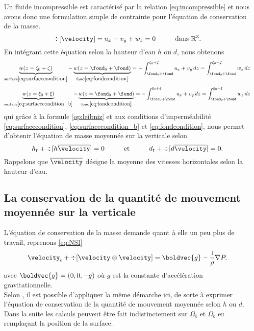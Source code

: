 \noindent Un fluide incompressible est caractérisé par la relation \eqref{eq:incompressible} et nous avons donc une formulation simple de contrainte pour l'équation de conservation de la masse.
\begin{equation}
	\div[\velocity] = u_x + v_y + w_z = 0 \hspace{1cm}\text{dans $\mathbb{R}^3$.}
\end{equation}
En intégrant cette équation selon la hauteur d'eau $h$ ou $d$, nous obtenons
\begin{equation}
	\underbrace{w(z=\zeta_0+\zeta)}_{\text{surface}\eqref{eq:surfacecondition} } - \underbrace{w(z=\fond_0 + \fond)}_{\text{fond} \eqref{eq:fondcondition}}  =  - \int_{\fond_0 + \fond}^{\zeta_0+\zeta}u_x + v_y\,dz = \int_{\fond_0 + \fond}^{\zeta_0+\zeta} w_z\,dz
\end{equation}
\begin{equation}
\underbrace{w(z=\xi_0+\xi)}_{\text{surface}\eqref{eq:surfacecondition_b} } - \underbrace{w(z=\fond_0 + \fond)}_{\text{fond} \eqref{eq:fondcondition}}  =  - \int_{\fond_0 + \fond}^{\xi_0+\xi}u_x + v_y\,dz = \int_{\fond_0 + \fond}^{\xi_0+\xi} w_z\,dz
\end{equation}
qui grâce à la formule \eqref{op:leibniz} et aux conditions d'imperméabilité \eqref{eq:surfacecondition}, \eqref{eq:surfacecondition_b} et \eqref{eq:fondcondition}, nous permet d'obtenir l'équation de masse moyennée sur la verticale selon \citet{Pons2018}
\begin{equation}
	h_t + \div[h\overline{\velocity}] = 0\hspace{1cm}\text{et}\hspace{1cm}	d_t + \div[d\overline{\velocity}] = 0.
\end{equation}
Rappelons que $\overline{\velocity}$ désigne la moyenne des vitesses horizontales selon la hauteur d'eau.
\subsection{La conservation de la quantité de mouvement moyennée sur la verticale}
\noindent L'équation de conservation de la masse demande quant à elle un peu plus de travail, reprenons \eqref{eq:NSI}
\begin{equation*}
	\velocity_t + \div[\velocity\otimes\velocity] = \boldvec{g} -\frac{1}{\rho} \nabla P.
\end{equation*}
avec $\boldvec{g} = \left(0, 0, -g\right)$ où $g$ est la constante d'accélération gravitationnelle.\\
Selon \citet{Pons2018}, il est possible d'appliquer la même démarche ici, de sorte à  exprimer l'équation de conservation de la quantité de mouvement moyennée selon $h$ ou $d$. Dans la suite les calculs peuvent être fait indistinctement sur $\Omega_b$ et $\Omega_b$ en remplaçant la position de la surface.\\


